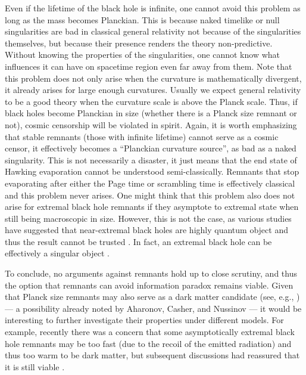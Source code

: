 \documentclass[12pt,preprintnumbers, floatfix, preprintnumbers, letterpaper, superscriptaddress,nofootinbib]{revtex4-2}
\begin{document}
Even if the lifetime of the black hole is infinite, one cannot avoid this problem as long as the mass becomes Planckian. This is because naked timelike or null singularities are bad in classical general relativity not because of the singularities themselves, but because their presence renders the theory non-predictive. Without knowing the properties of the singularities, one cannot know what influences it can have on spacetime region even far away from them. Note that this problem does not only arise when the curvature is mathematically divergent, it already arises for large enough curvatures. Usually we expect general relativity to be a good theory when the curvature scale is above the Planck scale. Thus, if black holes become Planckian in size (whether there is a Planck size remnant or not), cosmic censorship will be violated in spirit. Again, it is worth emphasizing that stable remnants (those with infinite lifetime) cannot serve as a cosmic censor, it effectively becomes a ``Planckian curvature source'', as bad as a naked singularity. This is not necessarily a disaster, it just means that the end state of Hawking evaporation cannot be understood semi-classically. Remnants that stop evaporating after either the Page time or scrambling time is effectively classical and this problem never arises. One might think that this problem also does not arise for extremal black hole remnants if they asymptote to extremal state when still being macroscopic in size. However, this is not the case, as various studies have suggested that near-extremal black holes are highly quantum object and thus the result cannot be trusted \cite{0209039,1005.2999,2210.02473,2303.07358,2307.10423,2309.04110,2409.08236}. In fact, an extremal black hole can be effectively a singular object \cite{0209039,2210.02473,2303.07358}.

To conclude, no arguments against remnants hold up to close scrutiny, and thus the option that remnants can avoid information paradox remains viable. Given that Planck size remnants may also serve as a dark matter candidate (see, e.g., \cite{MacGibbon,0406514,0205106,1805.03872}) --- a possibility already noted by  Aharonov,
Casher, and Nussinov \cite{ACN} --- it would be interesting to further investigate their properties under different models. For example, recently there was a concern that some asymptotically extremal black hole remnants may be too fast (due to the recoil of the emitted radiation) \cite{2102.06517} and thus too warm to be dark matter, but subsequent discussions had reassured that it is still viable \cite{2104.08919,2105.01627}. 
\end{document}
